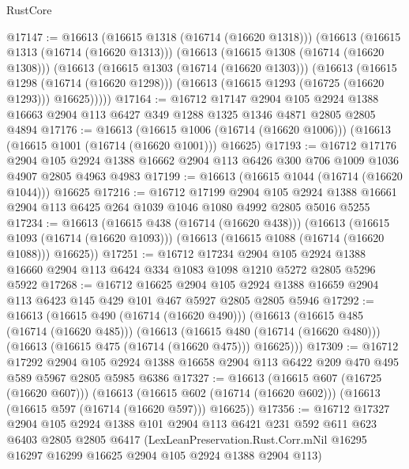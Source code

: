 \begin{lexlean}{RustCore}
\begin{coremodule}
@17147 := @16613
    (@16615 @1318 (@16714 (@16620 @1318)))
    (@16613
      (@16615 @1313 (@16714 (@16620 @1313)))
      (@16613
        (@16615 @1308 (@16714 (@16620 @1308)))
        (@16613
          (@16615 @1303 (@16714 (@16620 @1303)))
          (@16613
            (@16615 @1298 (@16714 (@16620 @1298)))
            (@16613 (@16615 @1293 (@16725 (@16620 @1293))) @16625)))))
@17164 := @16712
    @17147
    @2904
    @105
    @2924
    @1388
    @16663
    @2904
    @113
    @6427
    @349
    @1288
    @1325
    @1346
    @4871
    @2805
    @2805
    @4894
@17176 := @16613
    (@16615 @1006 (@16714 (@16620 @1006)))
    (@16613 (@16615 @1001 (@16714 (@16620 @1001))) @16625)
@17193 := @16712
    @17176
    @2904
    @105
    @2924
    @1388
    @16662
    @2904
    @113
    @6426
    @300
    @706
    @1009
    @1036
    @4907
    @2805
    @4963
    @4983
@17199 := @16613 (@16615 @1044 (@16714 (@16620 @1044))) @16625
@17216 := @16712
    @17199
    @2904
    @105
    @2924
    @1388
    @16661
    @2904
    @113
    @6425
    @264
    @1039
    @1046
    @1080
    @4992
    @2805
    @5016
    @5255
@17234 := @16613
    (@16615 @438 (@16714 (@16620 @438)))
    (@16613
      (@16615 @1093 (@16714 (@16620 @1093)))
      (@16613 (@16615 @1088 (@16714 (@16620 @1088))) @16625))
@17251 := @16712
    @17234
    @2904
    @105
    @2924
    @1388
    @16660
    @2904
    @113
    @6424
    @334
    @1083
    @1098
    @1210
    @5272
    @2805
    @5296
    @5922
@17268 := @16712
    @16625
    @2904
    @105
    @2924
    @1388
    @16659
    @2904
    @113
    @6423
    @145
    @429
    @101
    @467
    @5927
    @2805
    @2805
    @5946
@17292 := @16613
    (@16615 @490 (@16714 (@16620 @490)))
    (@16613
      (@16615 @485 (@16714 (@16620 @485)))
      (@16613
        (@16615 @480 (@16714 (@16620 @480)))
        (@16613 (@16615 @475 (@16714 (@16620 @475))) @16625)))
@17309 := @16712
    @17292
    @2904
    @105
    @2924
    @1388
    @16658
    @2904
    @113
    @6422
    @209
    @470
    @495
    @589
    @5967
    @2805
    @5985
    @6386
@17327 := @16613
    (@16615 @607 (@16725 (@16620 @607)))
    (@16613
      (@16615 @602 (@16714 (@16620 @602)))
      (@16613 (@16615 @597 (@16714 (@16620 @597))) @16625))
@17356 := @16712
    @17327
    @2904
    @105
    @2924
    @1388
    @101
    @2904
    @113
    @6421
    @231
    @592
    @611
    @623
    @6403
    @2805
    @2805
    @6417
    (LexLeanPreservation.Rust.Corr.mNil
      @16295
      @16297
      @16299
      @16625
      @2904
      @105
      @2924
      @1388
      @2904
      @113)

\end{coremodule}
\end{lexlean}
